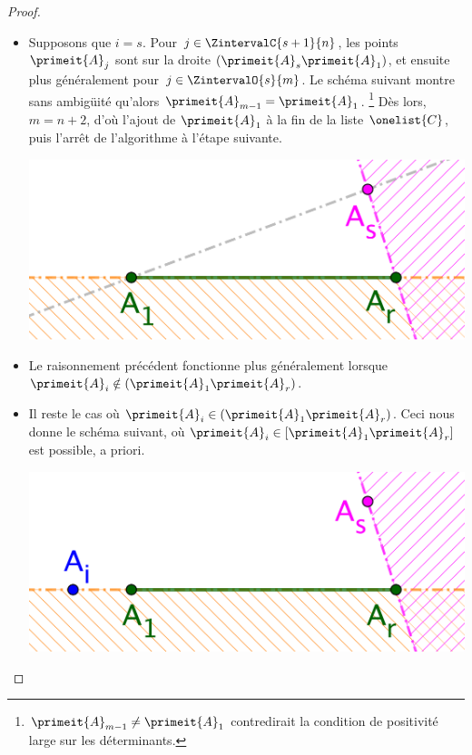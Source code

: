 \begin{proof}
\begin{itemize}
        \item Supposons que $i = s$. 
        Pour $j \in \ZintervalC{s+1}{n}$, les points $\primeit{A}_j$ sont sur la droite $( \primeit{A}_s \primeit{A}_1)$, 
        et ensuite plus généralement pour $j \in \ZintervalO{s}{m}$. 
        Le schéma suivant montre sans ambigüité qu'alors
        $\primeit{A}_{m-1} = \primeit{A}_1$.%
        \footnote{
            $\primeit{A}_{m-1} \neq \primeit{A}_1$ contredirait la condition de positivité large sur les déterminants.
        }
        Dès lors, $m = n+2$, d'où l'ajout de $\primeit{A}_1$ à la fin de la liste $\onelist{C}$, puis l'arrêt de l'algorithme à l'étape suivante.
        \begin{center}
        	\includegraphics[scale=.4]{content/polygon/at-least-one/algo-kgone-terminate-1.png}
        \end{center}


        \item Le raisonnement précédent fonctionne plus généralement lorsque $\primeit{A}_i \notin (\primeit{A}_1 \primeit{A}_r)$.


        \item Il reste le cas où $\primeit{A}_i \in (\primeit{A}_1 \primeit{A}_r)$.
       Ceci nous donne le schéma suivant, où
       $\primeit{A}_i \in [\primeit{A}_1 \primeit{A}_r]$ est possible, a priori. 
        \begin{center}
        	\includegraphics[scale=.4]{content/polygon/at-least-one/algo-kgone-terminate-2.png}
        \end{center}
        

\end{itemize}
\end{proof}
